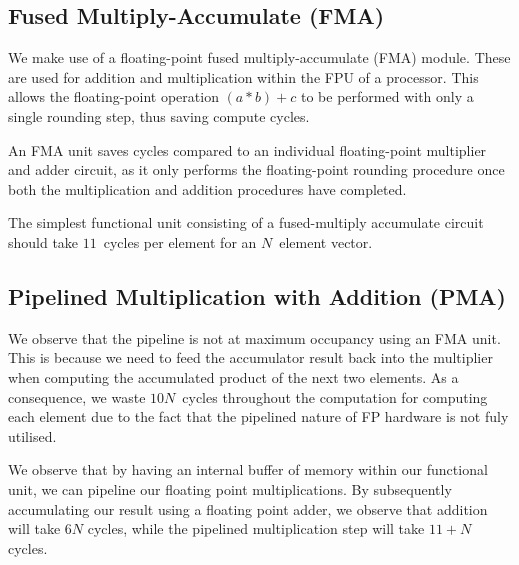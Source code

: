 \documentclass[a4paper,8pt]{report}
\begin{document}
\subsection{Fused Multiply-Accumulate (FMA)}
We make use of a floating-point fused multiply-accumulate (FMA) module. These are used
for addition and multiplication within the FPU of a processor. This allows the
floating-point operation $(a*b)+c$ to be performed with only a single rounding
step, thus saving compute cycles.

An FMA unit saves cycles compared to an individual floating-point multiplier and
adder circuit, as it only performs the floating-point rounding procedure once
both the multiplication and addition procedures have completed.

The simplest functional unit consisting of a fused-multiply accumulate circuit
should take $11$~cycles per element for an $N$~element vector.





\subsection{Pipelined Multiplication with Addition (PMA)}
We observe that the pipeline is not at maximum occupancy using an FMA unit. This
is because we need to feed the accumulator result back into the multiplier when
computing the accumulated product of the next two elements. As a consequence, we
waste $10N$~cycles throughout the computation for computing each element due to
the fact that the pipelined nature of FP hardware is not fuly utilised.

We observe that by having an internal buffer of memory within our functional
unit, we can pipeline our floating point multiplications. By subsequently
accumulating our result using a floating point adder, we observe that addition
will take $6N$ cycles, while the pipelined multiplication step will take $11+N$
cycles.
\end{document}
